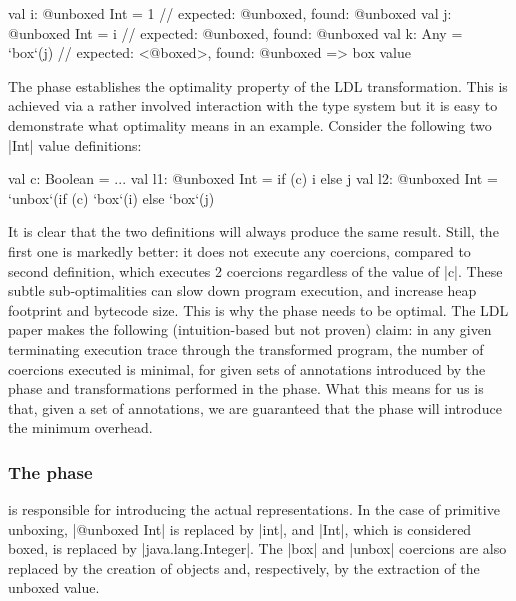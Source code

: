 \begin{lstlisting-nobreak}
val i: @unboxed Int = 1 // expected: @unboxed, found: @unboxed
val j: @unboxed Int = i // expected: @unboxed, found: @unboxed
val k: Any = `box`(j)             // expected:  <@boxed>, found: @unboxed => box value
\end{lstlisting-nobreak}

The \coerce{} phase establishes the optimality property of the LDL
transformation. This is achieved via a rather involved interaction
with the type system
but it is easy to demonstrate what optimality means in an example.
Consider the following two |Int| value definitions:

\begin{lstlisting-nobreak}
val c: Boolean = ...
val l1: @unboxed Int = if (c) i else j
val l2: @unboxed Int = `unbox`(if (c) `box`(i) else `box`(j)
\end{lstlisting-nobreak}

It is clear that the two definitions will always produce the same
result. Still, the first one is markedly better: it does not execute
any coercions, compared to second definition, which executes 2
coercions regardless of the value of |c|. These subtle
sub-optimalities can slow down program execution, and increase heap
footprint and bytecode size. This is why the \coerce{} phase needs
to be optimal. The LDL paper \cite{ldl} makes the following
(intuition-based but not proven) claim: in any given terminating
execution trace through the transformed program, the number of
coercions executed is minimal, 
for given sets of annotations introduced by
the \inject{} phase and transformations performed in the \commit{}
phase. What this means for us is that, given a set of annotations,
we are guaranteed that the \coerce{} phase will introduce the minimum
overhead.

\subsubsection{The \commit{} phase} is responsible for introducing the actual
representations. In the case of primitive unboxing, |@unboxed Int| is
replaced by |int|, and |Int|, which is considered boxed, is replaced
by |java.lang.Integer|. The |box| and |unbox| coercions are also
replaced by the creation of objects and, respectively, by the
extraction of the unboxed value.

